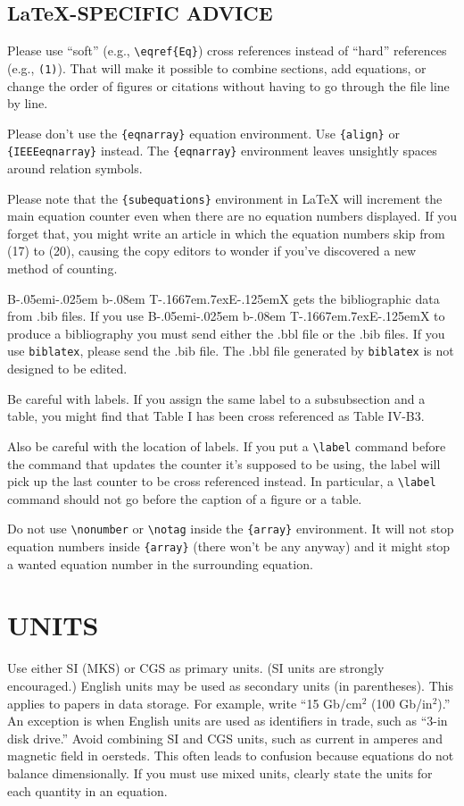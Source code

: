 \documentclass{IEEEoj}
\def\BibTeX{{\rm B\kern-.05em{\sc i\kern-.025em b}\kern-.08em
    T\kern-.1667em\lower.7ex\hbox{E}\kern-.125emX}}
\begin{document}
\subsection{\LaTeX-SPECIFIC ADVICE}

Please use ``soft'' (e.g., \verb|\eqref{Eq}|) cross references instead
of ``hard'' references (e.g., \verb|(1)|). That will make it possible
to combine sections, add equations, or change the order of figures or
citations without having to go through the file line by line.

Please don't use the \verb|{eqnarray}| equation environment. Use
\verb|{align}| or \verb|{IEEEeqnarray}| instead. The \verb|{eqnarray}|
environment leaves unsightly spaces around relation symbols.

Please note that the \verb|{subequations}| environment in {\LaTeX}
will increment the main equation counter even when there are no
equation numbers displayed. If you forget that, you might write an
article in which the equation numbers skip from (17) to (20), causing
the copy editors to wonder if you've discovered a new method of
counting.

{\BibTeX} gets the bibliographic
data from .bib files. If you use {\BibTeX} to produce a
bibliography you must send either the .bbl file or the .bib files.
If you use \texttt{biblatex}, please send the .bib file. The .bbl file
generated by \texttt{biblatex} is not designed to be edited.

Be careful with labels. If you assign the same label to a
subsubsection and a table, you might find that Table I has been cross
referenced as Table IV-B3.

Also be careful with the location of labels. If you put a
\verb|\label| command before the command that updates the counter it's
supposed to be using, the label will pick up the last counter to be
cross referenced instead. In particular, a \verb|\label| command
should not go before the caption of a figure or a table.

Do not use \verb|\nonumber| or \verb|\notag| inside the \verb|{array}| environment. It
will not stop equation numbers inside \verb|{array}| (there won't be
any anyway) and it might stop a wanted equation number in the
surrounding equation.

\section{UNITS}

Use either SI (MKS) or CGS as primary units. (SI units are strongly encouraged.) English units may be used as secondary units (in parentheses). This applies to papers in data storage. For example, write ``15 Gb/cm\(^{2 }\) (100 Gb/in\(^{2 }\)).'' An exception is when English units are used as identifiers in trade, such as ``3\textonehalf-in disk drive.'' Avoid combining SI and CGS units, such as current in amperes and magnetic field in oersteds. This often leads to confusion because equations do not balance dimensionally. If you must use mixed units, clearly state the units for each quantity in an equation.
\end{document}
